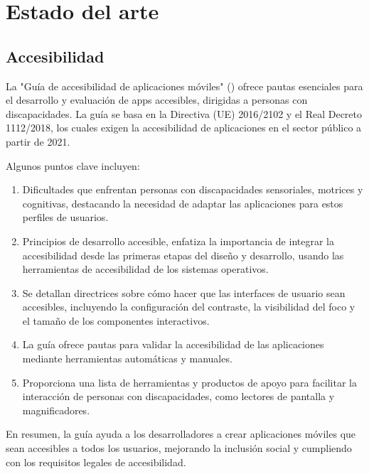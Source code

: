 \chapter{Estado del arte}

\section{Accesibilidad}

La "Guía de accesibilidad de aplicaciones móviles" (\cite{talero2020accesibilidadapps}) ofrece pautas esenciales para el desarrollo y evaluación de apps accesibles, dirigidas a personas con discapacidades. La guía se basa en la Directiva (UE) 2016/2102 y el Real Decreto 1112/2018, los cuales exigen la accesibilidad de aplicaciones en el sector público a partir de 2021.

Algunos puntos clave incluyen:

\begin{enumerate}
	\item Dificultades que enfrentan personas con discapacidades sensoriales, motrices y cognitivas, destacando la necesidad de adaptar las aplicaciones para estos perfiles de usuarios.

	\item Principios de desarrollo accesible, enfatiza la importancia de integrar la accesibilidad desde las primeras etapas del diseño y desarrollo, usando las herramientas de accesibilidad de los sistemas operativos.

	\item Se detallan directrices sobre cómo hacer que las interfaces de usuario sean accesibles, incluyendo la configuración del contraste, la visibilidad del foco y el tamaño de los componentes interactivos.

	\item La guía ofrece pautas para validar la accesibilidad de las aplicaciones mediante herramientas automáticas y manuales.

	\item Proporciona una lista de herramientas y productos de apoyo para facilitar la interacción de personas con discapacidades, como lectores de pantalla y magnificadores.
\end{enumerate}

En resumen, la guía ayuda a los desarrolladores a crear aplicaciones móviles que sean accesibles a todos los usuarios, mejorando la inclusión social y cumpliendo con los requisitos legales de accesibilidad.

